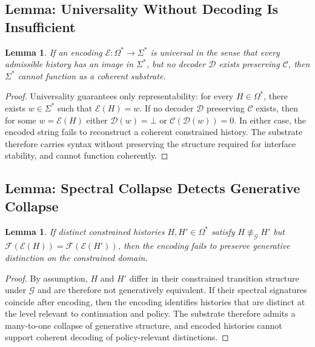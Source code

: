 \documentclass[12pt, a4paper]{article}
\theoremstyle{plain}
\newtheorem{lemma}[theorem]{Lemma}
\theoremstyle{definition}
\theoremstyle{remark}
\begin{document}
\subsection{Lemma: Universality Without Decoding Is Insufficient}

\begin{lemma}
\label{lem:universality}
If an encoding $\mathcal{E} : \Omega^* \to \Sigma^*$ is universal in the sense that every admissible history has an image in $\Sigma^*$, but no decoder $\mathcal{D}$ exists preserving $\mathcal{C}$, then $\Sigma^*$ cannot function as a coherent substrate.
\end{lemma}

\begin{proof}
Universality guarantees only representability: for every $H \in \Omega^*$, there exists $w \in \Sigma^*$ such that $\mathcal{E}(H) = w$. If no decoder $\mathcal{D}$ preserving $\mathcal{C}$ exists, then for some $w = \mathcal{E}(H)$ either $\mathcal{D}(w) = \bot$ or $\mathcal{C}(\mathcal{D}(w)) = 0$. In either case, the encoded string fails to reconstruct a coherent constrained history. The substrate therefore carries syntax without preserving the structure required for interface stability, and cannot function coherently.
\end{proof}

\subsection{Lemma: Spectral Collapse Detects Generative Collapse}

\begin{lemma}
\label{lem:spectral}
If distinct constrained histories $H, H' \in \Omega^*$ satisfy $H \not\equiv_{\mathcal{G}} H'$ but $\mathcal{F}(\mathcal{E}(H)) = \mathcal{F}(\mathcal{E}(H'))$, then the encoding fails to preserve generative distinction on the constrained domain.
\end{lemma}

\begin{proof}
By assumption, $H$ and $H'$ differ in their constrained transition structure under $\mathcal{G}$ and are therefore not generatively equivalent. If their spectral signatures coincide after encoding, then the encoding identifies histories that are distinct at the level relevant to continuation and policy. The substrate therefore admits a many-to-one collapse of generative structure, and encoded histories cannot support coherent decoding of policy-relevant distinctions.
\end{proof}
\end{document}
